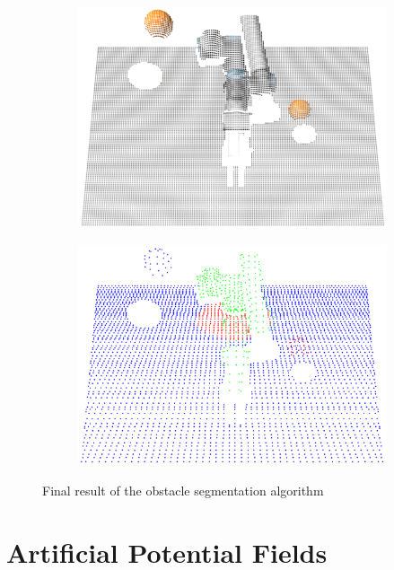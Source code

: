 \begin{figure}[h]
    \centering
    \begin{subfigure}{.5\linewidth}
      \centering
      \includegraphics[width=.95\linewidth]{figs/chp4/obstacles_before.png}
    \end{subfigure}%
    \begin{subfigure}{.5\linewidth}
      \centering
      \includegraphics[width=.95\linewidth]{figs/chp4/obstacles_after.png}
    \end{subfigure}
    \caption{Final result of the obstacle segmentation algorithm}
    \label{fig:obstacles}
\end{figure}

\section{Artificial Potential Fields}
\label{section:pf-method}

